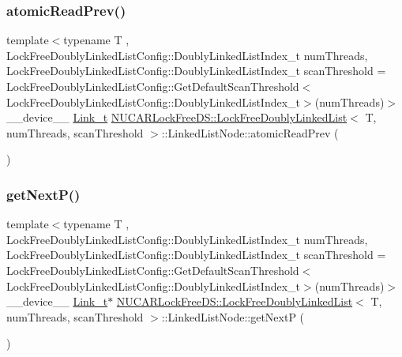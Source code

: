 \subsubsection{\texorpdfstring{atomic\+Read\+Prev()}{atomicReadPrev()}}
{\footnotesize\ttfamily template$<$typename T , Lock\+Free\+Doubly\+Linked\+List\+Config\+::\+Doubly\+Linked\+List\+Index\+\_\+t num\+Threads, Lock\+Free\+Doubly\+Linked\+List\+Config\+::\+Doubly\+Linked\+List\+Index\+\_\+t scan\+Threshold = Lock\+Free\+Doubly\+Linked\+List\+Config\+::\+Get\+Default\+Scan\+Threshold$<$\+Lock\+Free\+Doubly\+Linked\+List\+Config\+::\+Doubly\+Linked\+List\+Index\+\_\+t$>$(num\+Threads)$>$ \\
\+\_\+\+\_\+device\+\_\+\+\_\+ \mbox{\hyperlink{class_n_u_c_a_r_lock_free_d_s_1_1_lock_free_doubly_linked_list_a08f21d5e04bc2a02d6c1d8861a6ba0de}{Link\+\_\+t}} \mbox{\hyperlink{class_n_u_c_a_r_lock_free_d_s_1_1_lock_free_doubly_linked_list}{N\+U\+C\+A\+R\+Lock\+Free\+D\+S\+::\+Lock\+Free\+Doubly\+Linked\+List}}$<$ T, num\+Threads, scan\+Threshold $>$\+::Linked\+List\+Node\+::atomic\+Read\+Prev (\begin{DoxyParamCaption}{ }\end{DoxyParamCaption})\hspace{0.3cm}{\ttfamily [inline]}}

\mbox{\label{class_n_u_c_a_r_lock_free_d_s_1_1_lock_free_doubly_linked_list_1_1_linked_list_node_ae06fa31bdcd570875cd83af2c78bdd3b}} 
\subsubsection{\texorpdfstring{get\+Next\+P()}{getNextP()}}
{\footnotesize\ttfamily template$<$typename T , Lock\+Free\+Doubly\+Linked\+List\+Config\+::\+Doubly\+Linked\+List\+Index\+\_\+t num\+Threads, Lock\+Free\+Doubly\+Linked\+List\+Config\+::\+Doubly\+Linked\+List\+Index\+\_\+t scan\+Threshold = Lock\+Free\+Doubly\+Linked\+List\+Config\+::\+Get\+Default\+Scan\+Threshold$<$\+Lock\+Free\+Doubly\+Linked\+List\+Config\+::\+Doubly\+Linked\+List\+Index\+\_\+t$>$(num\+Threads)$>$ \\
\+\_\+\+\_\+device\+\_\+\+\_\+ \mbox{\hyperlink{class_n_u_c_a_r_lock_free_d_s_1_1_lock_free_doubly_linked_list_a08f21d5e04bc2a02d6c1d8861a6ba0de}{Link\+\_\+t}}$\ast$ \mbox{\hyperlink{class_n_u_c_a_r_lock_free_d_s_1_1_lock_free_doubly_linked_list}{N\+U\+C\+A\+R\+Lock\+Free\+D\+S\+::\+Lock\+Free\+Doubly\+Linked\+List}}$<$ T, num\+Threads, scan\+Threshold $>$\+::Linked\+List\+Node\+::get\+NextP (\begin{DoxyParamCaption}{ }\end{DoxyParamCaption})\hspace{0.3cm}{\ttfamily [inline]}}

